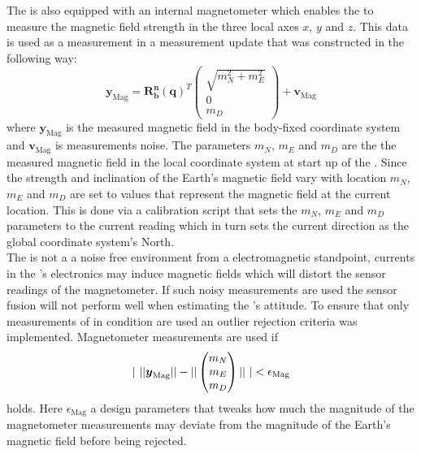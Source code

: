 The \abbrROV is also equipped with an internal magnetometer which enables the \abbrROV to measure the magnetic field strength in the three local axes $x$, $y$ and $z$. This data is used as a measurement in a measurement update that was constructed in the following way:
\begin{equation}
\boldsymbol{y}_{\text{Mag}} = 
    \boldsymbol{R^n_b}(\boldsymbol{q})^T
    \begin{pmatrix}
        \sqrt{m_N^2 +m_E^2}\\
        0\\
        m_D
    \end{pmatrix}
    + \boldsymbol{v}_{\text{Mag}}
\end{equation}
where $\boldsymbol{y}_{\text{Mag}}$ is the measured magnetic field in the body-fixed coordinate system and $\boldsymbol{v}_{\text{Mag}}$ is measurements noise. The parameters $m_N$, $m_E$ and $m_D$ are the the measured magnetic field in the local coordinate system at start up of the \abbrROV. Since the strength and inclination of the Earth's magnetic field vary with location $m_N$, $m_E$ and $m_D$ are set to values that represent the magnetic field at the current location. This is done via a calibration script that sets the $m_N$, $m_E$ and $m_D$ parameters to the current reading which in turn sets the current direction as the global coordinate system's North.\\
The \abbrROV is not a a noise free environment from a electromagnetic standpoint, currents in the \abbrROV's electronics may induce magnetic fields which will distort the sensor readings of the magnetometer. If such noisy measurements are used the sensor fusion will not perform well when estimating the \abbrROV's attitude. To ensure that only measurements of in condition are used an outlier rejection criteria was implemented. Magnetometer measurements are used if 
\begin{equation}
        |~||
\boldsymbol{y}_{\text{Mag}}||
    -
    ||
    \begin{pmatrix}
        m_N\\
        m_E\\
        m_D
    \end{pmatrix}||
     ~| < \epsilon_{\text{Mag}}
\end{equation}
holds. Here $\epsilon_{\text{Mag}}$ a design parameters that tweaks how much the magnitude of the magnetometer measurements may deviate from the magnitude of the Earth's magnetic field before being rejected.

